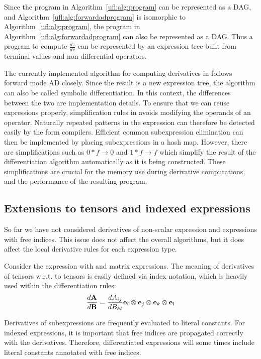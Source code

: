 Since the program in Algorithm~\ref{ufl:alg:program} can be
represented as a DAG, and Algorithm~\ref{ufl:alg:forwardadprogram} is
isomorphic to Algorithm~\ref{ufl:alg:program}, the program in
Algorithm~\ref{ufl:alg:forwardadprogram} can also be represented as a
DAG.  Thus a program to compute $\frac{d z}{d v}$ can be represented
by an expression tree built from terminal values and non-differential
operators.

The currently implemented algorithm for computing derivatives in
\ufl{} follows forward mode AD closely. Since the result is a new
expression tree, the algorithm can also be called symbolic
differentiation. In this context, the differences between the two are
implementation details.  To ensure that we can reuse expressions
properly, simplification rules in \ufl{} avoids modifying the operands
of an operator.  Naturally repeated patterns in the expression can
therefore be detected easily by the form compilers.  Efficient common
subexpression elimination can then be implemented by placing
subexpressions in a hash map.  However, there are simplifications such
as $0*f\rightarrow 0$ and $1*f\rightarrow f$ which simplify the result
of the differentiation algorithm automatically as it is being
constructed.  These simplifications are crucial for the memory use
during derivative computations, and the performance of the resulting
program.

\subsection{Extensions to tensors and indexed expressions}

So far we have not considered derivatives of non-scalar expression and
expressions with free indices.  This issue does not affect the overall
algorithms, but it does affect the local derivative rules for each
expression type.

Consider the expression  with  and
 matrix expressions.  The meaning of derivatives of tensors
w.r.t. to tensors is easily defined via index notation, which is
heavily used within the differentiation rules:
\begin{align}
\frac{d\mathbf{A}}{d\mathbf{B}} = \frac{dA_{ij}}{d B_{kl}} \mathbf{e}_i\otimes\mathbf{e}_j\otimes\mathbf{e}_k\otimes\mathbf{e}_l
\end{align}

Derivatives of subexpressions are frequently evaluated to literal
constants.  For indexed expressions, it is important that free indices
are propagated correctly with the derivatives.  Therefore,
differentiated expressions will some times include literal constants
annotated with free indices.

